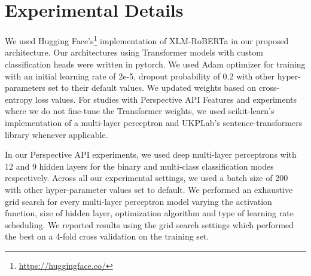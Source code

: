 \documentclass[
]{ceurart}
\begin{document}

\section{Experimental Details}
We used Hugging Face's\footnote{\url{https://huggingface.co/}} implementation of XLM-RoBERTa in our proposed architecture. Our architectures using Transformer models with custom classification heads were written in pytorch. We used Adam optimizer for training with an initial learning rate of 2e-5, dropout probability of 0.2 with other hyper-parameters set to their default values. We updated weights based on cross-entropy loss values. For studies with Perspective API Features and experiments where we do not fine-tune the Transformer weights, we used scikit-learn's\cite{scikit-learn} implementation of a multi-layer perceptron and UKPLab's sentence-transformers library\cite{reimers-2020-multilingual-sentence-bert} whenever applicable.

In our Perspective API experiments, we used deep multi-layer perceptrons with 12 and 9 hidden layers for the binary and multi-class classification modes respectively. Across all our experimental settings, we used a batch size of 200 with other hyper-parameter values set to default. We performed an exhaustive grid search for every multi-layer perceptron model varying the activation function, size of hidden layer, optimization algorithm and type of learning rate scheduling. We reported results using the grid search settings which performed the best on a 4-fold cross validation on the training set. 
\end{document}
